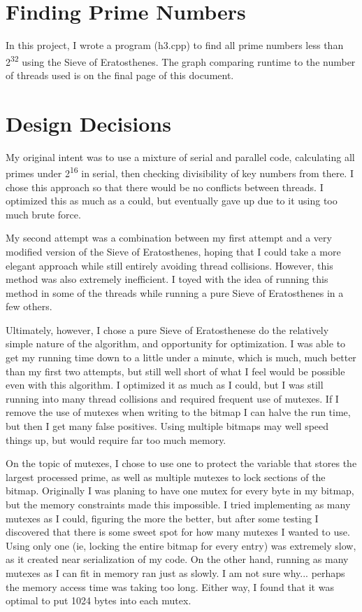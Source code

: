 \documentclass[letterpaper,10pt,twocolumn,titlepage]{article}
\begin{document}


\section{Finding Prime Numbers}
In this project, I wrote a program (h3.cpp) to find all prime numbers less than 2\textsuperscript{32}
using the Sieve of Eratosthenes. The graph comparing runtime to the number of threads used is on the final
page of this document.
 
\section{Design Decisions}
My original intent was to use a mixture of serial and parallel code, calculating all primes under 2\textsuperscript{16}
in serial, then checking divisibility of key numbers from there. I chose this approach so that there would be no conflicts
between threads. I optimized this as much as a could, but eventually gave up due to it using too much brute force.

My second attempt was a combination between my first attempt and a very modified version of the Sieve of Eratosthenes,
hoping that I could take a more elegant approach while still entirely avoiding thread collisions. However, this method
was also extremely inefficient. I toyed with the idea of running this method in some of the threads while running a pure
Sieve of Eratosthenes in a few others.

Ultimately, however, I chose a pure Sieve of Eratosthenese do the relatively simple nature of the algorithm, and opportunity
for optimization. I was able to get my running time down to a little under a minute, which is much, much better than my first two attempts,
but still well short of what I feel would be possible even with this algorithm. I optimized it as much as I could, but I was still
running into many thread collisions and required frequent use of mutexes. If I remove the use of mutexes when writing to the bitmap
I can halve the run time, but then I get many false positives. Using multiple bitmaps may well speed things up, but would require
far too much memory.

On the topic of mutexes, I chose to use one to protect the variable that stores the largest processed prime, as well as multiple
mutexes to lock sections of the bitmap. Originally I was planing to have one mutex for every byte in my bitmap, but the memory
constraints made this impossible. I tried implementing as many mutexes as I could, figuring the more the better, but after some testing
I discovered that there is some sweet spot for how many mutexes I wanted to use. Using only one (ie, locking the entire bitmap for every
entry) was extremely slow, as it created near serialization of my code. On the other hand, running as many mutexes as I can fit in memory
ran just as slowly. I am not sure why... perhaps the memory access time was taking too long. Either way, I found that it was optimal
to put 1024 bytes into each mutex.
\end{document}
